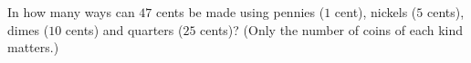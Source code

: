 In how many ways can $47$ cents be made using pennies ($1$ cent), nickels ($5$ cents), dimes ($10$ cents) and quarters ($25$ cents)? (Only the number of coins of each kind matters.)
